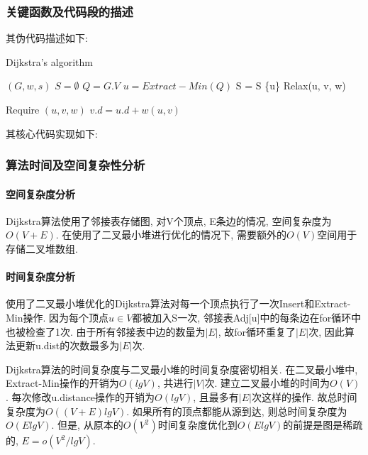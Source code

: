\subsubsection{关键函数及代码段的描述}
其伪代码描述如下:
\begin{algorithm}
	\caption{Dijkstra's algorithm}\label{alg:dijkstra}
	\begin{algorithmic}{1}
		\Require $(G, w, s)$
		\State $S = \emptyset$
		\State $Q = G.V$
		\State $u = Extract-Min(Q)$
		\State S = S \cup \{u\}
		\State Relax(u, v, w)
		\EndFor
		\EndWhile
	\end{algorithmic}

	\begin{algorithmic}{1}
		Require $(u, v, w)$
		\State $v.d = u.d + w(u, v)$
		\EndIf
	\end{algorithmic}
\end{algorithm}

其核心代码实现如下:


\subsubsection{算法时间及空间复杂性分析}
\paragraph{空间复杂度分析}
Dijkstra算法使用了邻接表存储图, 对V个顶点, E条边的情况, 空间复杂度为$O(V+E)$.
在使用了二叉最小堆进行优化的情况下, 需要额外的$O(V)$空间用于存储二叉堆数组.

\paragraph{时间复杂度分析}
使用了二叉最小堆优化的Dijkstra算法对每一个顶点执行了一次Insert和Extract-Min操作.
因为每个顶点$u\in V$都被加入S一次,
邻接表Adj[u]中的每条边在for循环中也被检查了1次. 由于所有邻接表中边的数量为$|E|$,
故for循环重复了$|E|$次, 因此算法更新u.dist的次数最多为$|E|$次.\par

Dijkstra算法的时间复杂度与二叉最小堆的时间复杂度密切相关.
在二叉最小堆中, Extract-Min操作的开销为$O(lgV)$, 共进行$|V|$次.
建立二叉最小堆的时间为$O(V)$. 每次修改u.distance操作的开销为$O(lgV)$,
且最多有$|E|$次这样的操作. 故总时间复杂度为$O((V+E)lgV)$.
如果所有的顶点都能从源到达, 则总时间复杂度为$O(ElgV)$. 但是,
从原本的$O(V^2)$时间复杂度优化到$O(ElgV)$的前提是图是稀疏的, $E=o(V^2/lgV)$.
